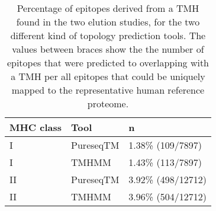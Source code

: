 \begin{table}[ht]
\centering
\begin{tabular}{lll}
  \hline
MHC class & Tool & n \\ 
  \hline
I & PureseqTM & 1.38\% (109/7897) \\ 
  I & TMHMM & 1.43\% (113/7897) \\ 
  II & PureseqTM & 3.92\% (498/12712) \\ 
  II & TMHMM & 3.96\% (504/12712) \\ 
   \hline
\end{tabular}
\caption{Percentage of epitopes derived from a TMH found in the two elution studies, for the two different kind of topology prediction tools. The values between braces show the the number of epitopes that were predicted to overlapping with a TMH per all epitopes that could be uniquely mapped to the representative human reference proteome.} 
\label{tab:elution}
\end{table}
